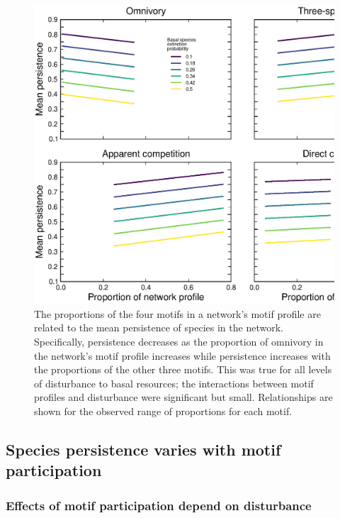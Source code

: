 \documentclass[12pt]{article}
\begin{document}
\begin{spacing}{2.0}
        \begin{figure}
            \centering
            \includegraphics[height=.5\textheight]{figures/persistence_motif_profiles.eps}
            \caption{The proportions of the four motifs in a network's motif profile are related to the mean persistence of species in the network. Specifically, persistence decreases as the proportion of omnivory in the network's motif profile increases while persistence increases with the proportions of the other three motifs. This was true for all levels of disturbance to basal resources; the interactions between motif profiles and disturbance were significant but small. Relationships are shown for the observed range of proportions for each motif.}      
            \label{fig:motif_profile_persistence}
        \end{figure}    


    \subsection*{Species persistence varies with motif participation} 
    
    
        \subsubsection*{Effects of motif participation depend on disturbance}
        

\end{spacing}
\end{document}
